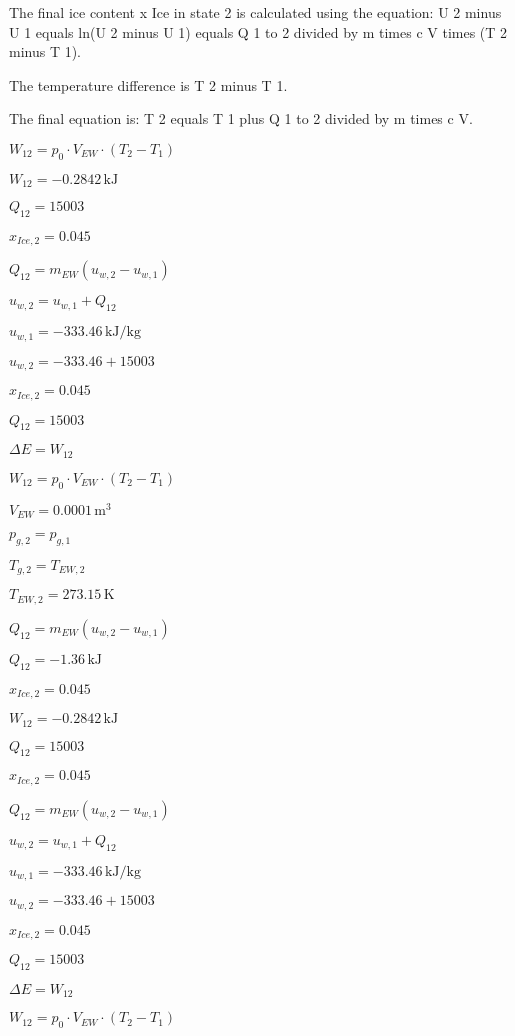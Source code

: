 The final ice content x Ice in state 2 is calculated using the equation:  
U 2 minus U 1 equals ln(U 2 minus U 1) equals Q 1 to 2 divided by m times c V times (T 2 minus T 1).  

The temperature difference is T 2 minus T 1.  

The final equation is:  
T 2 equals T 1 plus Q 1 to 2 divided by m times c V.

\( W_{12} = p_0 \cdot V_{EW} \cdot (T_{2} - T_{1}) \)  

\( W_{12} = -0.2842 \, \text{kJ} \)  

\( Q_{12} = 15003 \)  

\( x_{Ice,2} = 0.045 \)  

\( Q_{12} = m_{EW} (u_{w,2} - u_{w,1}) \)  

\( u_{w,2} = u_{w,1} + Q_{12} \)  

\( u_{w,1} = -333.46 \, \text{kJ/kg} \)  

\( u_{w,2} = -333.46 + 15003 \)  

\( x_{Ice,2} = 0.045 \)  

\( Q_{12} = 15003 \)  

\( \Delta E = W_{12} \)  

\( W_{12} = p_0 \cdot V_{EW} \cdot (T_{2} - T_{1}) \)  

\( V_{EW} = 0.0001 \, \text{m}^3 \)  

\( p_{g,2} = p_{g,1} \)  

\( T_{g,2} = T_{EW,2} \)  

\( T_{EW,2} = 273.15 \, \text{K} \)  

\( Q_{12} = m_{EW} (u_{w,2} - u_{w,1}) \)  

\( Q_{12} = -1.36 \, \text{kJ} \)  

\( x_{Ice,2} = 0.045 \)  

\( W_{12} = -0.2842 \, \text{kJ} \)  

\( Q_{12} = 15003 \)  

\( x_{Ice,2} = 0.045 \)  

\( Q_{12} = m_{EW} (u_{w,2} - u_{w,1}) \)  

\( u_{w,2} = u_{w,1} + Q_{12} \)  

\( u_{w,1} = -333.46 \, \text{kJ/kg} \)  

\( u_{w,2} = -333.46 + 15003 \)  

\( x_{Ice,2} = 0.045 \)  

\( Q_{12} = 15003 \)  

\( \Delta E = W_{12} \)  

\( W_{12} = p_0 \cdot V_{EW} \cdot (T_{2} - T_{1}) \)  

